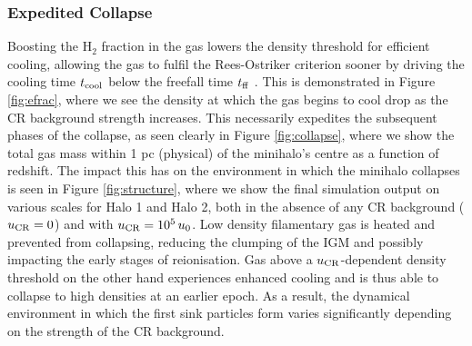 \documentclass[usenatbib]{mn2e}
\newcommand{\htwo}{\mathrm{H}_2}
\newcommand{\ucr}{{u}_{\rm \small CR}}
\begin{document}
\subsubsection{Expedited Collapse}
\label{sec:expedited_collapse}
Boosting the $\htwo$ fraction in the gas lowers the density threshold for efficient cooling, allowing the gas to fulfil the Rees-Ostriker criterion sooner by driving the cooling time $t_{\rm \small cool}$ below the freefall time $t_{\rm \small ff}$ \citep{ReesOstriker1977}.
This is demonstrated in Figure \ref{fig:efrac}, where we see the density at which the gas begins to cool drop as the CR background strength increases.  
This necessarily expedites the subsequent phases of the collapse, as seen clearly in Figure \ref{fig:collapse}, where we show the total gas mass within 1 pc (physical) of the minihalo's centre as a function of redshift.  
The impact this has on the environment in which the minihalo collapses is seen in Figure \ref{fig:structure}, where we show the final simulation output on various scales for Halo 1 and Halo 2, both in the absence of any CR background ($\ucr=0$) and with $\ucr=10^5\,u_0$. 
Low density filamentary gas is heated and prevented from collapsing, reducing the clumping of the IGM and possibly impacting the early stages of reionisation.
Gas above a $\ucr$-dependent density threshold on the other hand experiences enhanced cooling and is thus able to collapse to high densities at an earlier epoch.
As a result, the dynamical environment in which the first sink particles form varies significantly depending on the strength of the CR background.
\end{document}
